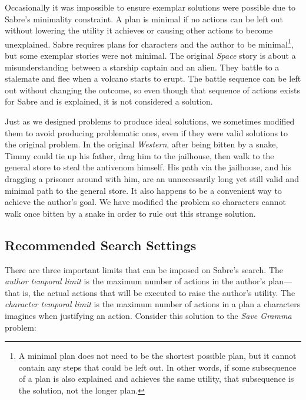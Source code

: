 \documentclass{nilreport}
\begin{document}
Occasionally it was impossible to ensure exemplar solutions were possible
due to Sabre's minimality constraint. A plan is minimal if no actions
can be left out without lowering the utility it achieves or causing
other actions to become unexplained. Sabre requires plans for characters
and the author to be minimal\footnote{A minimal plan does not need to be the shortest possible plan, but
it cannot contain any steps that could be left out. In other words,
if some subsequence of a plan is also explained and achieves the same
utility, that subsequence is the solution, not the longer plan.}, but some exemplar stories were not minimal. The original \emph{Space}
story is about a misunderstanding between a starship captain and an
alien. They battle to a stalemate and flee when a volcano starts to
erupt. The battle sequence can be left out without changing the outcome,
so even though that sequence of actions exists for Sabre and is explained,
it is not considered a solution.

Just as we designed problems to produce ideal solutions, we sometimes
modified them to avoid producing problematic ones, even if they were
valid solutions to the original problem. In the original \emph{Western},
after being bitten by a snake, Timmy could tie up his father, drag
him to the jailhouse, then walk to the general store to steal the
antivenom himself. His path via the jailhouse, and his dragging a
prisoner around with him, are an unnecessarily long yet still valid
and minimal path to the general store. It also happens to be a convenient
way to achieve the author's goal. We have modified the problem so
characters cannot walk once bitten by a snake in order to rule out
this strange solution.

\subsection{Recommended Search Settings}

There are three important limits that can be imposed on Sabre's search.
The \emph{author temporal limit} is the maximum number of actions
in the author's plan---that is, the actual actions that will be executed
to raise the author's utility. The \emph{character temporal limit}
is the maximum number of actions in a plan a characters imagines when
justifying an action. Consider this solution to the \emph{Save Gramma}
problem:

\medskip{}

\noindent{}
\end{document}

